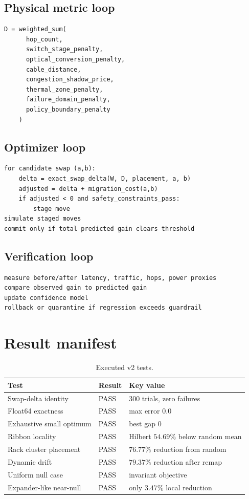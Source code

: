 \documentclass[11pt]{article}
\theoremstyle{remark}
\begin{document}
\subsection{Physical metric loop}
\begin{lstlisting}
D = weighted_sum(
      hop_count,
      switch_stage_penalty,
      optical_conversion_penalty,
      cable_distance,
      congestion_shadow_price,
      thermal_zone_penalty,
      failure_domain_penalty,
      policy_boundary_penalty
    )
\end{lstlisting}

\subsection{Optimizer loop}
\begin{lstlisting}
for candidate swap (a,b):
    delta = exact_swap_delta(W, D, placement, a, b)
    adjusted = delta + migration_cost(a,b)
    if adjusted < 0 and safety_constraints_pass:
        stage move
simulate staged moves
commit only if total predicted gain clears threshold
\end{lstlisting}

\subsection{Verification loop}
\begin{lstlisting}
measure before/after latency, traffic, hops, power proxies
compare observed gain to predicted gain
update confidence model
rollback or quarantine if regression exceeds guardrail
\end{lstlisting}

\section{Result manifest}

\begin{table}[h]
\centering
\caption{Executed v2 tests.}
\begin{tabular}{lll}
\toprule
Test & Result & Key value \\
\midrule
Swap-delta identity & PASS & 300 trials, zero failures \\
Float64 exactness & PASS & max error $0.0$ \\
Exhaustive small optimum & PASS & best gap $0$ \\
Ribbon locality & PASS & Hilbert $54.69\%$ below random mean \\
Rack cluster placement & PASS & $76.77\%$ reduction from random \\
Dynamic drift & PASS & $79.37\%$ reduction after remap \\
Uniform null case & PASS & invariant objective \\
Expander-like near-null & PASS & only $3.47\%$ local reduction \\
\bottomrule
\end{tabular}
\end{table}
\end{document}
